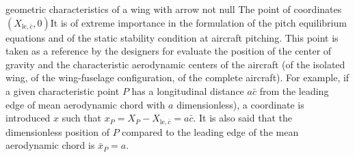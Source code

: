 \documentclass[[12pt,twoside]{book}
\begin{document}
\begin{myExampleX}{geometric characteristics of a wing with arrow not null}{}
The point of coordinates $(X_{\mathrm{le},\bar{c}},0)$It is of extreme importance in the formulation
of the pitch equilibrium equations and of the static stability condition at
aircraft pitching. This point is taken as a reference by the designers for
evaluate the position of the center of gravity and the characteristic aerodynamic centers of the aircraft
(of the isolated wing, of the wing-fuselage configuration, of the complete aircraft).
For example, if a given characteristic point $P$ has a longitudinal distance 
$a\bar{c}$ from the leading edge of mean aerodynamic chord with $a$ dimensionless), 
a coordinate is introduced $x$ such that $x_P = X_P - X_{\mathrm{le},\bar{c}} = a\bar{c}$.
It is also said that the dimensionless position of $P$ compared to the leading edge of the mean
aerodynamic chord is $\bar{x}_P=a$.

\end{myExampleX}
\end{document}
